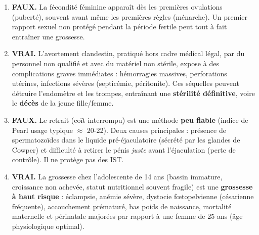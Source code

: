 \documentclass[11pt]{article}
\begin{document}
\begin{corrige}
\begin{enumerate}
\item \textbf{FAUX.} La fécondité féminine apparaît dès les premières ovulations (puberté), souvent avant même les premières règles (ménarche). Un premier rapport sexuel non protégé pendant la période fertile peut tout à fait entraîner une grossesse.
\item \textbf{VRAI.} L'avortement clandestin, pratiqué hors cadre médical légal, par du personnel non qualifié et avec du matériel non stérile, expose à des complications graves immédiates : hémorragies massives, perforations utérines, infections sévères (septicémie, péritonite). Ces séquelles peuvent détruire l'endomètre et les trompes, entraînant une \textbf{stérilité définitive}, voire le \textbf{décès} de la jeune fille/femme.
\item \textbf{FAUX.} Le retrait (coït interrompu) est une méthode \textbf{peu fiable} (indice de Pearl usage typique $\approx$ 20-22). Deux causes principales : présence de spermatozoïdes dans le liquide pré-éjaculatoire (sécrété par les glandes de Cowper) et difficulté à retirer le pénis \emph{juste} avant l'éjaculation (perte de contrôle). Il ne protège pas des IST.
\item \textbf{VRAI.} La grossesse chez l'adolescente de 14 ans (bassin immature, croissance non achevée, statut nutritionnel souvent fragile) est une \textbf{grossesse à haut risque} : éclampsie, anémie sévère, dystocie fœtopelvienne (césarienne fréquente), accouchement prématuré, bas poids de naissance, mortalité maternelle et périnatale majorées par rapport à une femme de 25 ans (âge physiologique optimal).
\end{enumerate}
\end{corrige}
\end{document}
